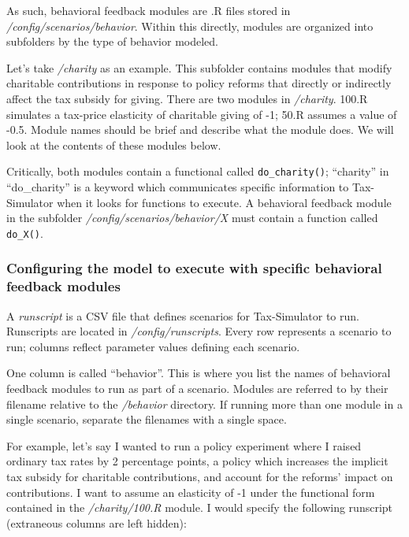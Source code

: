 \documentclass[
]{article}
\begin{document}
As such, behavioral feedback modules are .R files stored in
\emph{/config/scenarios/behavior}. Within this directly, modules are
organized into subfolders by the type of behavior modeled.

Let's take \emph{/charity} as an example. This subfolder contains
modules that modify charitable contributions in response to policy
reforms that directly or indirectly affect the tax subsidy for giving.
There are two modules in \emph{/charity}. 100.R simulates a tax-price
elasticity of charitable giving of -1; 50.R assumes a value of -0.5.
Module names should be brief and describe what the module does. We will
look at the contents of these modules below.

Critically, both modules contain a functional called
\texttt{do\_charity()}; ``charity'' in ``do\_charity'' is a keyword
which communicates specific information to Tax-Simulator when it looks
for functions to execute. A behavioral feedback module in the subfolder
\emph{/config/scenarios/behavior/X} must contain a function called
\texttt{do\_X()}.

\hypertarget{configuring-the-model-to-execute-with-specific-behavioral-feedback-modules}{%
\subsubsection{Configuring the model to execute with specific behavioral
feedback
modules}\label{configuring-the-model-to-execute-with-specific-behavioral-feedback-modules}}

A \emph{runscript} is a CSV file that defines scenarios for
Tax-Simulator to run. Runscripts are located in
\emph{/config/runscripts}. Every row represents a scenario to run;
columns reflect parameter values defining each scenario.

One column is called ``behavior''. This is where you list the names of
behavioral feedback modules to run as part of a scenario. Modules are
referred to by their filename relative to the \emph{/behavior}
directory. If running more than one module in a single scenario,
separate the filenames with a single space.

For example, let's say I wanted to run a policy experiment where I
raised ordinary tax rates by 2 percentage points, a policy which
increases the implicit tax subsidy for charitable contributions, and
account for the reforms' impact on contributions. I want to assume an
elasticity of -1 under the functional form contained in the
\emph{/charity/100.R} module. I would specify the following runscript
(extraneous columns are left hidden):
\end{document}
